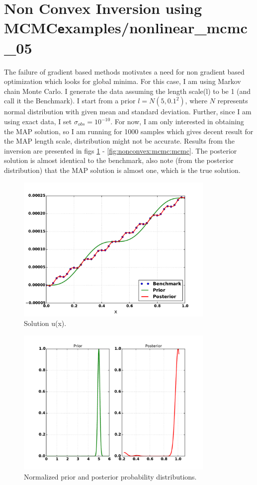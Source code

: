 \documentclass[%
notitlepage,
]{revtex4-1}
\begin{document}
\section{Non Convex Inversion using MCMC{\texttt examples/nonlinear\_mcmc\_05}}
The failure of gradient based methods motivates a need for non gradient based optimization which looks for global minima. For this case, I am using Markov chain Monte Carlo. I generate the data assuming the length scale(l) to be 1 (and call it the Benchmark). I start from a prior $l = N(5, 0.1^2)$, where $N$ represents normal distribution with given mean and standard deviation. Further, since I am using exact data, I set $\sigma_{obs} = 10^{-10}$. For now, I am only interested in obtaining the MAP solution, so I am running for 1000 samples which gives decent result for the MAP length scale, distribution might not be accurate. Results from the inversion are presented in figs \ref{fig:nonconvex:mcmc:u} - \ref{fig:nonconvex:mcmc:mcmc}. The posterior solution is almost identical to the benchmark, also note (from the posterior distribution) that the MAP solution is almost one, which is the true solution.
\begin{figure}[!h]
	\includegraphics[width=0.85\textwidth]{figures/nonlinear_mcmc_05/u.pdf}
    \caption{Solution u(x).}
    \label{fig:nonconvex:mcmc:u}
\end{figure}

\begin{figure}[!h]
	\includegraphics[width=0.85\textwidth]{figures/nonlinear_mcmc_05/pdfs.pdf}
    \caption{Normalized prior and posterior probability distributions.}
    \label{fig:nonconvex:mcmc:pdfs}
\end{figure}
\end{document}
